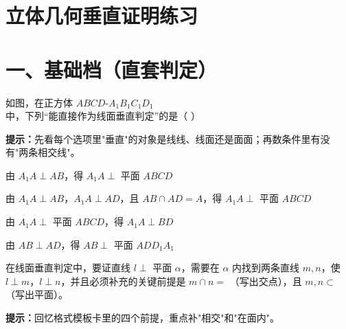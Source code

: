 \documentclass{exam-zh}
\begin{document}
\section*{立体几何垂直证明练习}

\section*{一、基础档（直套判定）}


\begin{question}[points=5]
  \noindent
  \begin{minipage}[t]{\dimexpr\linewidth-60mm-6mm\relax}
    \vspace{0pt}
    如图，在正方体 $ABCD\text{-}A_1B_1C_1D_1$ 中，下列“能直接作为线面垂直判定”的是（    ）
    \begin{hintbox}
\textbf{提示：}先看每个选项里"垂直"的对象是线线、线面还是面面；再数条件里有没有"两条相交线"。\end{hintbox}

    \par
    \begin{choices}[columns=1]
      \item 由 $A_1A\perp AB$，得 $A_1A\perp$ 平面 $ABCD$
      \item 由 $A_1A\perp AB$，$A_1A\perp AD$，且 $AB\cap AD=A$，得 $A_1A\perp$ 平面 $ABCD$
      \item 由 $A_1A\perp$ 平面 $ABCD$，得 $A_1A\perp BD$
      \item 由 $AB\perp AD$，得 $AB\perp$ 平面 $ADD_1A_1$
    \end{choices}
  \end{minipage}\hfill
  \begin{diagramcoltikz}{60mm}{正方体，观察侧棱与底面内两条相交棱的关系。}
  }
  \end{diagramcoltikz}
\end{question}




\begin{question}[points=5]
  \noindent
  \begin{minipage}[t]{\dimexpr\linewidth-60mm-6mm\relax}
    \vspace{0pt}
    在线面垂直判定中，要证直线 $l\perp$ 平面 $\alpha$，需要在 $\alpha$ 内找到两条直线 $m,n$，使 $l\perp m$，$l\perp n$，并且必须补充的关键前提是 $m\cap n=$ \underline{\quad\quad\quad}（写出交点），且 $m,n\subset$ \underline{\quad\quad\quad}（写出平面）。
    \begin{hintbox}
\textbf{提示：}回忆格式模板卡里的四个前提，重点补"相交"和"在面内"。\end{hintbox}

  \end{minipage}\hfill
  \begin{diagramcoltikz}{60mm}{线面垂直判定四件套，重点补"相交"和"在面内"。}
  }
  \end{diagramcoltikz}
\end{question}
\end{document}
